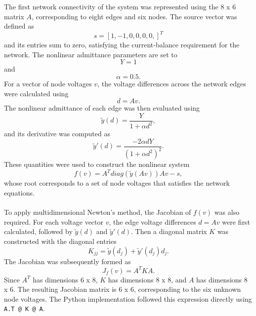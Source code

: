 \documentclass[12pt]{article}
\begin{document}
The first network connectivity of the system was represented using the 8 x 6 matrix $A$, corresponding to eight edges and six nodes. The source vector was defined as \begin{equation} s = [1, -1, 0, 0, 0, 0,]^T \end{equation} and its entries sum to zero, satisfying the current-balance requirement for the network. The nonlinear admittance parameters are set to \begin{equation} Y = 1 \end{equation} and \begin{equation} \alpha = 0.5.\end{equation} For a vector of node voltages $v$, the voltage differences across the network edges were calculated using \begin{equation} d = Av. \end{equation} The nonlinear admittance of each edge was then evaluated using \begin{equation}
    \tilde{y}(d) = \frac{Y}{1 + \alpha d^2},
\end{equation}
and its derivative was computed as 
\begin{equation}
    \tilde{y}'(d) = \frac{-2 \alpha d Y}{(1 + \alpha d^2)^2}.
\end{equation}
These quantities were used to construct the nonlinear system \begin{equation}
    f(v) = A^T diag(\tilde{y}(Av))Av - s,
\end{equation}
whose root corresponds to a set of node voltages that satisfies the network equations. 
\\\\
To apply multidimensional Newton's method, the Jacobian of $f(v)$ was also required. For each voltage vector $v$, the edge voltage differences $d = Av$ were first calculated, followed by $\tilde{y}(d)$ and $\tilde{y}'(d)$. Then a diagonal matrix $K$ was constructed with the diagonal entries \begin{equation}
    K_{jj} = \tilde{y}(d_j) + \tilde{y}'(d_j)d_j.
\end{equation}
The Jacobian was subsequently formed as 
\begin{equation}
    J_f(v) = A^TKA.
\end{equation}
Since $A^T$ has dimensions 6 x 8, $K$ has dimensions 8 x 8, and $A$ has dimensions 8 x 6. The resulting Jacobian matrix is 6 x 6, corresponding to the six unknown node voltages. The Python implementation followed this expression directly using \verb|A.T @ K @ A|. 
\end{document}
